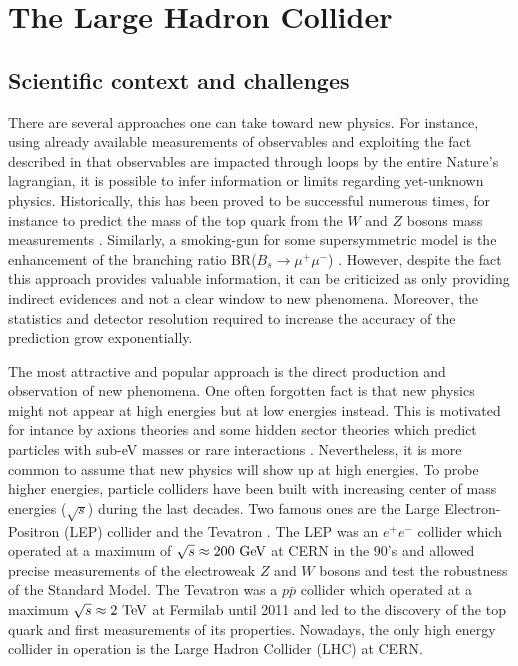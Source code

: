     \section{The Large Hadron Collider}

    \subsection{Scientific context and challenges}

    There are several approaches one can take toward new physics. For instance, using already
    available measurements of observables and exploiting the fact described in
     that observables are impacted through loops by
    the entire Nature's lagrangian, it is possible to infer information or limits regarding
    yet-unknown physics. Historically, this has been proved to be successful numerous times,
    for instance to predict the mass of the top quark from the $W$ and $Z$ bosons mass
    measurements \cite{discoveryOfTopQuark}. Similarly, a smoking-gun for some supersymmetric
    model is the enhancement of the branching ratio BR($B_s \rightarrow \mu^+\mu^-$)
    \cite{BsToMuMu}. However,
    despite the fact this approach provides valuable information, it can be criticized as
    only providing indirect evidences and not a clear window to new phenomena. Moreover,
    the statistics and detector resolution required to increase the accuracy of the
    prediction grow exponentially.

    The most attractive and popular approach is the direct production and observation of
    new phenomena. One often forgotten fact is that new physics might not appear at high
    energies but at low energies instead. This is motivated for intance by axions
    theories and some hidden sector theories which predict particles with sub-eV masses
    or rare interactions \cite{PolarizedHelium, CavityForHiddenPhotons}. Nevertheless, it
    is more common to assume that new physics will show up at high energies. To probe
    higher energies, particle colliders have been
    built with increasing center of mass energies ($\sqrt{s}$) during the last decades.
    Two famous ones are the Large Electron-Positron (LEP) collider \cite{LEP} and the
    Tevatron \cite{Tevatron}. The
    LEP was an $e^+e^-$ collider which operated at a maximum of $\sqrt{s} \approx 200~\text{GeV}$
    at CERN in the 90's and allowed precise measurements of the electroweak $Z$ and $W$
    bosons and test the robustness of the Standard Model. The Tevatron was a $p\bar{p}$
    collider which operated at a maximum $\sqrt{s} \approx 2~\text{TeV}$ at Fermilab until 2011
    and led to the discovery of the top quark and first measurements of its properties.
    Nowadays, the only high energy collider in operation is the Large Hadron Collider (LHC)
    at CERN.

